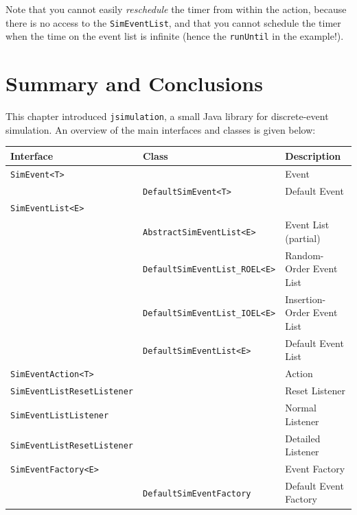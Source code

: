 \documentclass[12pt]{book}
\begin{document}
Note that you cannot easily {\em reschedule\/} the timer
  from within the action, because there is no
  access to the \lstinline-SimEventList-,
  and that you cannot schedule the timer
  when the time on the event list is infinite
  (hence the \lstinline|runUntil| in the example!).

\section{Summary and Conclusions}

This chapter introduced \lstinline|jsimulation|,
  a small Java library for discrete-event simulation.
An overview of the main interfaces and classes is given below:

\noindent
\begin{tabular}{|l|l|l|}
  \hline
  {\bf Interface} & {\bf Class} & {\bf Description} \\
  \hline
  \lstinline[basicstyle=\footnotesize]|SimEvent<T>|     & & Event \\
                              & \lstinline[basicstyle=\footnotesize]|DefaultSimEvent<T>| & Default Event \\
  \hline
  \lstinline[basicstyle=\footnotesize]|SimEventList<E>| & & \\
                              & \lstinline[basicstyle=\footnotesize]|AbstractSimEventList<E>|     & Event List (partial) \\
                              & \lstinline[basicstyle=\footnotesize]|DefaultSimEventList_ROEL<E>| & Random-Order Event List \\
                              & \lstinline[basicstyle=\footnotesize]|DefaultSimEventList_IOEL<E>| & Insertion-Order Event List \\
                              & \lstinline[basicstyle=\footnotesize]|DefaultSimEventList<E>|      & Default Event List \\
  \hline
  \lstinline[basicstyle=\footnotesize]|SimEventAction<T>| & & Action \\
  \hline
  \lstinline[basicstyle=\footnotesize]|SimEventListResetListener| & & Reset Listener \\
  \lstinline[basicstyle=\footnotesize]|SimEventListListener|      & & Normal Listener \\
  \lstinline[basicstyle=\footnotesize]|SimEventListResetListener| & & Detailed Listener \\
  \hline
  \lstinline[basicstyle=\footnotesize]|SimEventFactory<E>|     & & Event Factory \\
                              & \lstinline[basicstyle=\footnotesize]|DefaultSimEventFactory| & Default Event Factory \\
  \hline
\end{tabular}
\end{document}
